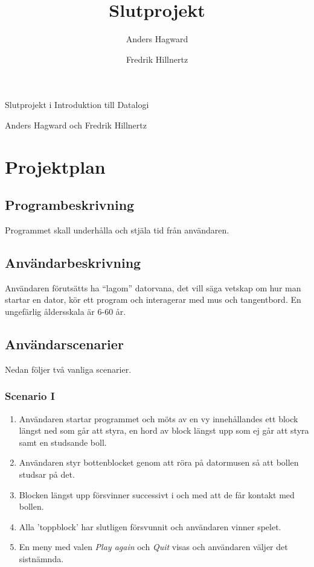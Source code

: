 \documentclass[11pt,a4paper]{article}
\author{Anders Hagward \and Fredrik Hillnertz}
\title{Slutprojekt}
\begin{document}
\thispagestyle{empty}
\begin{center}
\huge Slutprojekt i Introduktion till Datalogi

\normalsize Anders Hagward och Fredrik Hillnertz
\end{center}
\newpage

\tableofcontents
\newpage

\section{Projektplan}

\subsection{Programbeskrivning}
Programmet skall underhålla och stjäla tid från användaren.

\subsection{Användarbeskrivning}
Användaren förutsätts ha ``lagom'' datorvana, det vill säga vetskap om hur man startar en dator, kör ett program och interagerar med mus och tangentbord. En ungefärlig åldersskala är 6-60 år.

\subsection{Användarscenarier}
Nedan följer två vanliga scenarier.

\subsubsection{Scenario I}
\begin{enumerate}
	\item Användaren startar programmet och möts av en vy innehållandes ett block längst ned som går att styra, en hord av block längst upp som ej går att styra samt en studsande boll.
	\item Användaren styr bottenblocket genom att röra på datormusen så att bollen studsar på det.
	\item Blocken längst upp försvinner successivt i och med att de får kontakt med bollen.
	\item Alla 'toppblock' har slutligen försvunnit och användaren vinner spelet.
	\item En meny med valen \emph{Play again} och \emph{Quit} visas och användaren väljer det sistnämnda.
\end{enumerate}
\end{document}
